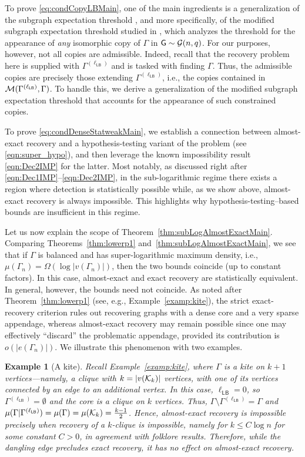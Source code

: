\documentclass[12pt]{article}
\newtheorem{example}{Example}
\newcommand{\calG}{{\cal G}}
\newcommand{\calK}{{\cal K}}
\newcommand{\calM}{{\cal M}}
\newcommand{\s}[1]{\mathsf{#1}}
\begin{document}
To prove \eqref{eq:condCopyLBMain}, one of the main ingredients is a generalization of the subgraph expectation threshold \cite{kahn2007thresholds}, and more specifically, of the modified subgraph expectation threshold studied in \cite{mossel2022second}, which analyzes the threshold for the appearance of \emph{any} isomorphic copy of $\Gamma$ in $\s{G} \sim \calG(n,q)$. For our purposes, however, not all copies are admissible. Indeed, recall that the recovery problem here is supplied with $\Gamma^{(\ell_{\s{LB}})}$ and is tasked with finding $\Gamma$. Thus, the admissible copies are precisely those extending $\Gamma^{(\ell_{\s{LB}})}$, i.e., the copies contained in $\calM(\Gamma^{(\ell_{\s{LB}})},\Gamma)$. To handle this, we derive a generalization of the modified subgraph expectation threshold that accounts for the appearance of such constrained copies. 

To prove \eqref{eq:condDenseStatweakMain}, we establish a connection between almost-exact recovery and a hypothesis-testing variant of the problem (see \eqref{eqn:super_hypo}), and then leverage the known impossibility result \eqref{eqn:Dec2IMP} for the latter. Most notably, as discussed right after \eqref{eqn:Dec1IMP}--\eqref{eqn:Dec2IMP}, in the sub-logarithmic regime there exists a region where detection is statistically possible while, as we show above, almost-exact recovery is always impossible. This highlights why hypothesis-testing--based bounds are insufficient in this regime.

Let us now explain the scope of Theorem~\ref{thm:subLogAlmostExactMain}. Comparing Theorems~\ref{thm:lowerp1} and~\ref{thm:subLogAlmostExactMain}, we see that if $\Gamma$ is balanced and has super-logarithmic maximum density, i.e., $\mu(\Gamma_n) = \Omega(\log |v(\Gamma_n)|)$, then the two bounds coincide (up to constant factors). In this case, almost-exact and exact recovery are statistically equivalent. In general, however, the bounds need not coincide. As noted after Theorem~\ref{thm:lowerp1} (see, e.g., Example~\ref{examp:kite}), the strict exact-recovery criterion rules out recovering graphs with a dense core and a very sparse appendage, whereas almost-exact recovery may remain possible since one may effectively ``discard'' the problematic appendage, provided its contribution is $o(|e(\Gamma_n)|)$. We illustrate this phenomenon with two examples.

\begin{example}[A kite]
Recall Example~\ref{examp:kite}, where $\Gamma$ is a kite on $k+1$ vertices---namely, a clique with $k = |v(\calK_k)|$ vertices, with one of its vertices connected by an edge to an additional vertex. In this case, $\ell_{\s{LB}} = 0$, so $\Gamma^{(\ell_{\s{LB}})} = \emptyset$ and the core is a clique on $k$ vertices. Thus, $\Gamma\setminus\Gamma^{(\ell_{\s{LB}})} = \Gamma$ and $\mu(\Gamma\vert\Gamma^{(\ell_{\s{LB}})}) = \mu(\Gamma) = \mu(\calK_k)=\frac{k-1}{2}$. Hence, almost-exact recovery is impossible precisely when recovery of a $k$-clique is impossible, namely for $k \leq C \log n$ for some constant $C > 0$, in agreement with folklore results. Therefore, while the dangling edge precludes exact recovery, it has no effect on almost-exact recovery.
\end{example}
\end{document}
